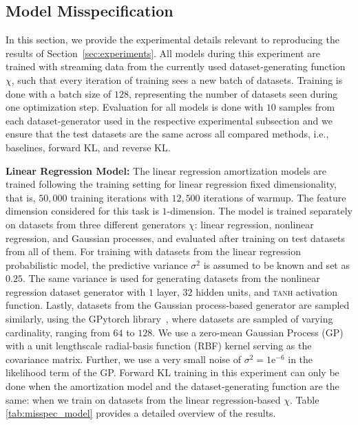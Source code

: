 
\subsection{Model Misspecification}
\label{appdx:details_misspecification}
In this section, we provide the experimental details relevant to reproducing the results of Section~\ref{sec:experiments}.
All models during this experiment are trained with streaming data from the currently used dataset-generating function $\chi$, such that every iteration of training sees a new batch of datasets. Training is done with a batch size of $128$, representing the number of datasets seen during one optimization step. Evaluation for all models is done with $10$ samples from each dataset-generator used in the respective experimental subsection and we ensure that the test datasets are the same across all compared methods, i.e., baselines, forward KL, and reverse KL.

\textbf{Linear Regression Model:} The linear regression amortization models are trained following the training setting for linear regression fixed dimensionality, that is, $50,000$ training iterations with $12,500$ iterations of warmup. The feature dimension considered for this task is $1$-dimension. The model is trained separately on datasets from three different generators $\chi$: linear regression, nonlinear regression, and Gaussian processes, and evaluated after training on test datasets from all of them.
For training with datasets from the linear regression probabilistic model, the predictive variance $\sigma^2$ is assumed to be known and set as $0.25$. 
The same variance is used for generating datasets from the nonlinear regression dataset generator with $1$ layer, $32$ hidden units, and \textsc{tanh} activation function. 
Lastly, datasets from the Gaussian process-based generator are sampled similarly, using the GPytorch library~\cite{gardner2018gpytorch}, where datasets are sampled of varying cardinality, ranging from $64$ to $128$. We use a zero-mean Gaussian Process (GP) with a unit lengthscale radial-basis function (RBF) kernel serving as the covariance matrix. Further, we use a very small noise of $\sigma^2 = 1\mathrm{e}^{-6}$ in the likelihood term of the GP.
Forward KL training in this experiment can only be done when the amortization model and the dataset-generating function are the same: when we train on datasets from the linear regression-based $\chi$. Table \ref{tab:misspec_model} provides a detailed overview of the results.


